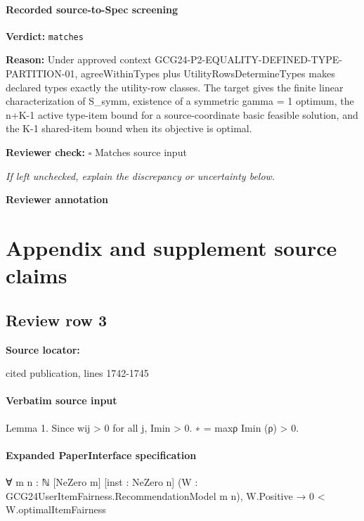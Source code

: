 \documentclass[10pt]{article}
\newcommand{\reviewerbox}{%
  \par\noindent\fbox{\parbox{0.96\linewidth}{\rule{0pt}{0.38in}}}\par
}
\newcommand{\reviewmatch}[1]{%
  \par\noindent\textbf{Reviewer check:} $\square$\; #1\par
  \noindent\emph{If left unchecked, explain the discrepancy or uncertainty below.}\par
}
\begin{document}
\paragraph{Recorded source-to-Spec screening}
\textbf{Verdict:} \texttt{matches}
\\
{\raggedright
\textbf{Reason:} Under approved context GCG24-\allowbreak{}P2-\allowbreak{}EQUALITY-\allowbreak{}DEFINED-\allowbreak{}TYPE-\allowbreak{}PARTITION-\allowbreak{}01, agreeWithinTypes plus UtilityRowsDetermineTypes makes declared types exactly the utility-\allowbreak{}row classes.\allowbreak{} The target gives the finite linear characterization of S\_\allowbreak{}symm, existence of a symmetric gamma = 1 optimum, the n+K-\allowbreak{}1 active type-\allowbreak{}item bound for a source-\allowbreak{}coordinate basic feasible solution, and the K-\allowbreak{}1 shared-\allowbreak{}item bound when its objective is optimal.\allowbreak{}
\par}
\reviewmatch{Matches source input}
\noindent\textbf{Reviewer annotation}\par
\reviewerbox
\clearpage
\hypertarget{source-claim-9c3a977985663e10}{}
\hypertarget{source-section-1743f0a28d68d6cc}{}
\section*{Appendix and supplement source claims}
\subsection*{Review row 3}
\textbf{Source locator:} {\footnotesize\raggedright cited publication, lines 1742-\allowbreak{}1745\par}
\paragraph{Verbatim source input}
\begin{ReviewVerbatim}
Lemma 1. Since wij > 0 for all j, Imin
> 0.
∗
= maxρ Imin (ρ) > 0.
\end{ReviewVerbatim}



\paragraph{Expanded PaperInterface specification}
\begin{ReviewVerbatim}
∀ {m n : ℕ} [NeZero m] [inst : NeZero n] (W : GCG24UserItemFairness.RecommendationModel m n),
  W.Positive → 0 < W.optimalItemFairness
\end{ReviewVerbatim}
\end{document}
